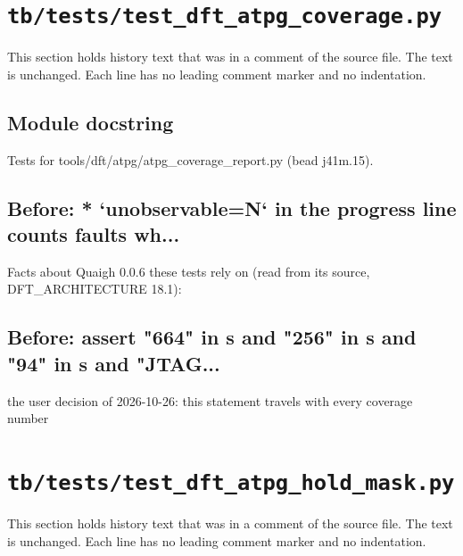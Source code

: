 \section{\texttt{tb/tests/test\_dft\_atpg\_coverage.py}}\label{cr:suite:test-dft-atpg-coverage}

This section holds history text that was in a comment of the source file. The text is unchanged. Each line has no leading comment marker and no indentation.

\begin{record}

\subsection*{Module docstring}

\begin{textblock}
Tests for tools/dft/atpg/atpg_coverage_report.py (bead j41m.15).
\end{textblock}

\subsection*{Before: * `unobservable=N` in the progress line counts faults wh...}

\begin{textblock}
Facts about Quaigh 0.0.6 these tests rely on (read from its source, DFT_ARCHITECTURE 18.1):
\end{textblock}

\subsection*{Before: assert "664" in s and "256" in s and "94" in s and "JTAG...}

\begin{textblock}
the user decision of 2026-10-26: this statement travels with every coverage number
\end{textblock}

\end{record}

\section{\texttt{tb/tests/test\_dft\_atpg\_hold\_mask.py}}\label{cr:suite:test-dft-atpg-hold-mask}

This section holds history text that was in a comment of the source file. The text is unchanged. Each line has no leading comment marker and no indentation.

